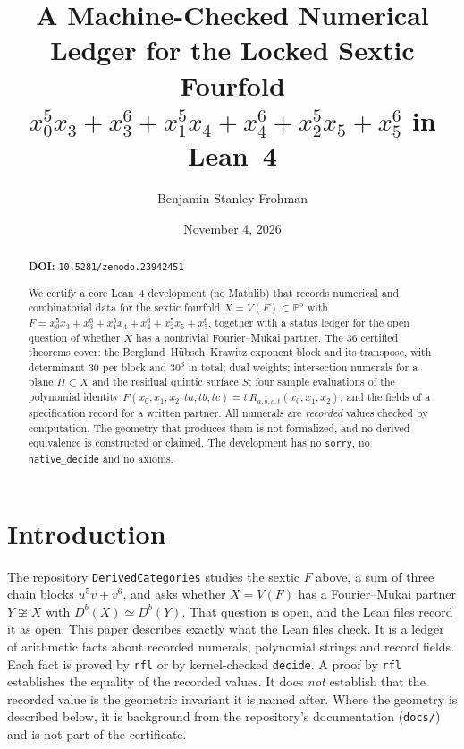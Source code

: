 \documentclass[11pt]{amsart}
\title[DerivedCategories]{A Machine-Checked Numerical Ledger for the Locked Sextic Fourfold $x_0^5x_3+x_3^6+x_1^5x_4+x_4^6+x_2^5x_5+x_5^6$ in Lean~4}
\author{Benjamin Stanley Frohman}
\date{November 4, 2026}
\theoremstyle{definition}
\theoremstyle{remark}
\begin{document}
\begin{abstract}
\noindent\textbf{DOI:} \texttt{10.5281/zenodo.23942451}\par\smallskip

We certify a core Lean~4 development (no Mathlib) that records numerical and combinatorial data for the sextic fourfold $X=V(F)\subset\mathbb P^5$ with $F=x_0^5x_3+x_3^6+x_1^5x_4+x_4^6+x_2^5x_5+x_5^6$, together with a status ledger for the open question of whether $X$ has a nontrivial Fourier--Mukai partner. The 36 certified theorems cover: the Berglund--H\"ubsch--Krawitz exponent block and its transpose, with determinant $30$ per block and $30^3$ in total; dual weights; intersection numerals for a plane $\Pi\subset X$ and the residual quintic surface $S$; four sample evaluations of the polynomial identity $F(x_0,x_1,x_2,ta,tb,tc)=t\,R_{a,b,c,t}(x_0,x_1,x_2)$; and the fields of a specification record for a written partner. All numerals are \emph{recorded} values checked by computation. The geometry that produces them is not formalized, and no derived equivalence is constructed or claimed. The development has no \texttt{sorry}, no \texttt{native\_decide} and no axioms.
\end{abstract}
\maketitle
{}\par


\section{Introduction}
The repository \texttt{DerivedCategories} studies the sextic $F$ above, a sum of three chain blocks $u^5v+v^6$, and asks whether $X=V(F)$ has a Fourier--Mukai partner $Y\not\cong X$ with $D^b(X)\simeq D^b(Y)$. That question is open, and the Lean files record it as open. This paper describes exactly what the Lean files check. It is a ledger of arithmetic facts about recorded numerals, polynomial strings and record fields. Each fact is proved by \texttt{rfl} or by kernel-checked \texttt{decide}. A proof by \texttt{rfl} establishes the equality of the recorded values. It does \emph{not} establish that the recorded value is the geometric invariant it is named after. Where the geometry is described below, it is background from the repository's documentation (\texttt{docs/}) and is not part of the certificate.
\end{document}
